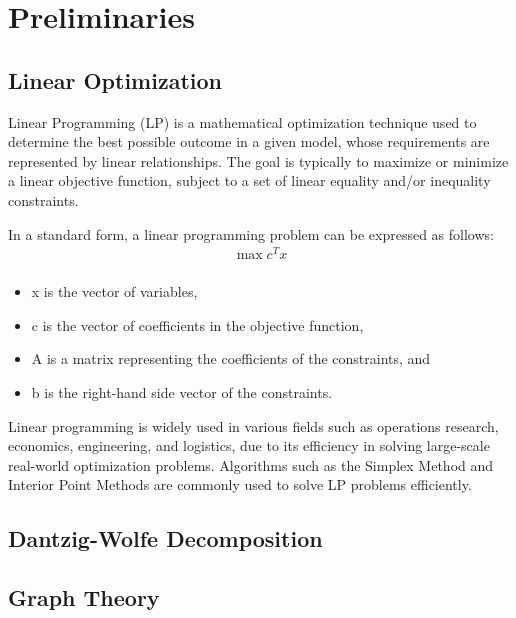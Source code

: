 \chapter{Preliminaries}

	\section{Linear Optimization}
	
		Linear Programming (LP) is a mathematical optimization technique used to determine the best possible outcome in a given model, whose requirements are represented by linear relationships. The goal is typically to maximize or minimize a linear objective function, subject to a set of linear equality and/or inequality constraints.
		
		In a standard form, a linear programming problem can be expressed as follows:
		\begin{align*}
			\max c^T x \\
		\end{align*}
		\begin{itemize}
			\item x is the vector of variables,
			\item c is the vector of coefficients in the objective function,
			\item A is a matrix representing the coefficients of the constraints, and
			\item b is the right-hand side vector of the constraints.
		\end{itemize}
		
		Linear programming is widely used in various fields such as operations research, economics, engineering, and logistics, due to its efficiency in solving large-scale real-world optimization problems. Algorithms such as the Simplex Method and Interior Point Methods are commonly used to solve LP problems efficiently.
	
		\clearpage
	
	\section{Dantzig-Wolfe Decomposition}
	
		\clearpage
	
	\section{Graph Theory}
	
